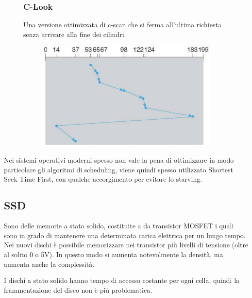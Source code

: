 \begin{figure}[H]
    \centering
    \begin{minipage}{0.5\textwidth}
        \subsubsection*{C-Look}
        Una versione ottimizzata di c-scan che si ferma all'ultima richiesta senza arrivare alla fine dei cilindri.
    \end{minipage}
    \hfill
    \begin{minipage}{0.4\textwidth}
        \begin{figure}[H]
            \centering
            \includegraphics[width=1\linewidth]{assets/c-look.jpg}
        \end{figure}
    \end{minipage}
\end{figure}

Nei sistemi operativi moderni spesso non vale la pena di ottimizzare in modo particolare gli algoritmi di scheduling, viene quindi spesso utilizzato Shortest Seek Time First, con qualche accorgimento per evitare lo starving.

\subsection{SSD}
Sono delle memorie a stato solido, costituite a da transistor MOSFET i quali sono in grado di mantenere una determinata carica elettrica per un lungo tempo.
\spacer
Nei nuovi dischi è possibile memorizzare nei transistor più livelli di tensione (oltre al solito 0 o 5V). In questo modo si aumenta notevolmente la densità, ma aumenta anche la complessità.

\spacer
I dischi a stato solido hanno tempo di accesso costante per ogni cella, quindi la frammentazione del disco non è più problematica.

